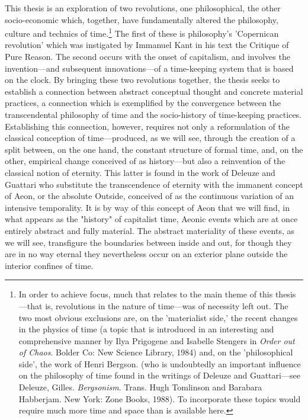 This thesis is an exploration of two revolutions, one philosophical, the other socio-economic which, together, have fundamentally altered the philosophy, culture and technics of time.\footnote{In order to achieve focus, much that relates to the main theme of this thesis---that is, revolutions in the nature of time---was of necessity left out. The two most obvious exclusions are, on the 'materialist side,' the recent changes in the physics of time (a topic that is introduced in an interesting and comprehensive manner by Ilya Prigogene and Isabelle Stengers in \textit{Order out of Chaos}. Bolder Co: New Science Library, 1984) and, on the 'philosophical side', the work of Henri Bergson. (who is undoubtedly an important influence on the philosophy of time found in the writings of Deleuze and Guattari---see Deleuze, Gilles. \textit{Bergsonism}. Trans. Hugh Tomlinson and Barabara Habberjam. New York: Zone Books, 1988). To incorporate these topics would require much more time and space than is available here.} The first of these is philosophy's 'Copernican revolution' which was instigated by Immanuel Kant in his text the Critique of Pure Reason. The second occurs with the onset of capitalism, and involves the invention---and subsequent innovations---of a time-keeping  system that is based on the clock. By bringing these two revolutions together, the thesis seeks to establish a connection between abstract conceptual thought and concrete material practices, a connection which is exemplified by the convergence between the transcendental philosophy of time and the socio-history of time-keeping practices. Establishing this connection, however, requires not only a reformulation of the classical conception of time---produced, as we will see, through the creation of a split between, on the one hand, the constant structure of formal time, and, on the other, empirical change conceived of as history---but also a reinvention of the classical notion of eternity. This latter is found in the work of Deleuze and Guattari who substitute the transcendence of eternity with the immanent concept of Aeon, or the absolute Outside, conceived of as the continuous variation of an intensive temporality. It is by way of this concept of Aeon that we will find, in what appears as the "history" of capitalist time, Aeonic events which are at once entirely abstract and fully material. The abstract materiality of these events, as we will see, transfigure the boundaries between inside and out, for though they are in no way eternal they nevertheless occur on an exterior plane outside the interior confines of time. 

